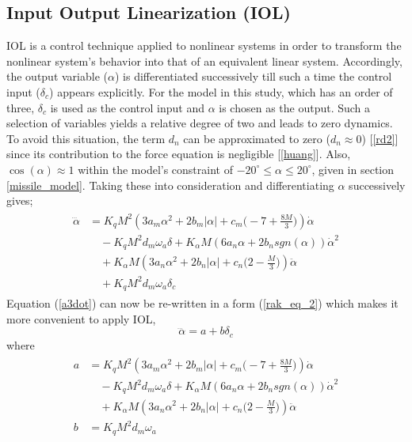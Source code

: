 \documentclass[conference]{IEEEtran}
\begin{document}
	\subsection{Input Output Linearization (IOL)}\label{AA}
		IOL is a control technique applied to nonlinear systems in order to transform the nonlinear system's behavior into that of an equivalent linear system.  Accordingly, the output variable ($\alpha$) is differentiated successively till such a time the control input ($\delta_c$) appears explicitly. For the model in this study, which has an order of three, $\delta_c$ is used as the control input and $\alpha$ is chosen as the output. Such a selection of variables yields a relative degree of two and leads to zero dynamics. To avoid this situation, the term $d_n$ can be approximated to zero ($d_n \approx 0$) [\ref{rd2}] since its contribution to the force equation is negligible [\ref{huang}]. Also, $\cos(\alpha) \approx 1$ within the model's constraint of $-20^\circ \leq \alpha \leq 20^\circ$, given in section \ref{missile_model}. Taking these into consideration and differentiating $\alpha$ successively gives;
		\begin{eqnarray}
			\begin{aligned}
				\dddot{\alpha}&=K_q M^2(3a_m\alpha^2+2b_m|\alpha|+c_m\Big(-7+\frac{8M}{3}\Big))\dot{\alpha}\\ 
				&\quad - K_q M^2d_m\omega_a\delta+K_{\alpha}M(6a_n\alpha+2b_n sgn(\alpha))\dot{\alpha}^2\\ 
				&\quad + K_\alpha M(3a_n\alpha^2+2b_n|\alpha|+c_n\Big(2-\frac{M}{3}\Big))\ddot{\alpha}\\ 
				&\quad + K_q M^2d_m\omega_a\delta_c \label{a3dot}
			\end{aligned}
		\end{eqnarray}
		Equation (\ref{a3dot}) can now be re-written in a form (\ref{rak_eq_2}) which makes it more convenient to apply IOL,
		\begin{equation}
			\dddot{\alpha} = a + b\delta_c \label{rak_eq_2}
		\end{equation}
		where 
		\begin{eqnarray}
			\begin{aligned}
				a &= K_qM^2(3a_m\alpha^2+2b_m|\alpha|+c_m\Big(-7+\frac{8M}{3}\Big))\dot{\alpha} \\ 
				&\quad -K_qM^2d_m\omega_a\delta+K_\alpha M(6a_n\alpha+2b_nsgn(\alpha))\dot{\alpha}^2\\ 
				&\quad+K_\alpha M(3a_n\alpha^2+2b_n|\alpha|+c_n\Big(2-\frac{M}{3}\Big))\ddot{\alpha} \\
				b &= K_q M^2d_m\omega_a \nonumber
			\end{aligned}
		\end{eqnarray}
\end{document}
